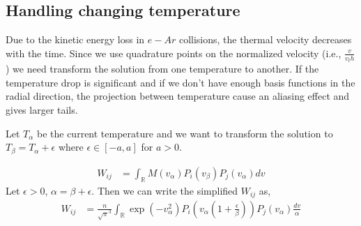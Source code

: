 \documentclass{article}
\newcommand{\reals}{\mathbb{R}}
\begin{document}
\subsection{Handling changing temperature}
Due to the kinetic energy loss in $e-Ar$ collisions, the thermal velocity decreases with the time. Since we use quadrature points on the normalized velocity (i.e., $\frac{v}{v_th}$) we need transform the solution from one temperature to another. If the temperature drop is significant and if we don't have enough basis functions in the radial direction, the projection between temperature cause an aliasing effect and gives larger tails. 

Let $T_\alpha$ be the current temperature and we want to transform the solution to $T_\beta=T_\alpha + \epsilon$ where $\epsilon \in [-a,a]$ for $a>0$.

\begin{align}
W_{ij} &= \int_{\reals} M(v_\alpha) P_i(v_\beta) P_j(v_\alpha)dv \label{eq:basis_change}
\end{align}
Let $\epsilon >0$, $\alpha = \beta + \epsilon$. Then we can write the simplified $W_{ij}$ as, 
\begin{align}
W_{ij} &= \frac{n}{\sqrt{\pi}^{3}}  \int_{\reals}  \exp(-v_\alpha^2) P_i (v_\alpha (1 + \frac{\epsilon}{\beta})) P_j(v_\alpha) \frac{dv}{\alpha} \\
\end{align}
\end{document}
